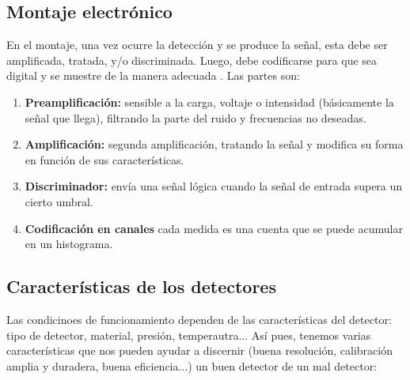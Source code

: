 \subsection{Montaje electrónico}

En el montaje, una vez ocurre la detección y se produce la señal, esta debe ser amplificada, tratada, y/o discriminada. Luego, debe codificarse para que sea digital y se muestre de la manera adecuada . Las partes son: 

\begin{enumerate}
    \item \textbf{Preamplificación:} sensible a la carga, voltaje o intensidad (básicamente la señal que llega), filtrando la parte del ruido y frecuencias no deseadas. 
    \item \textbf{Amplificación:} segunda amplificación, tratando la señal y modifica su forma en función de sus características.
    \item \textbf{Discriminador:} envía una señal lógica cuando la señal de entrada supera un cierto umbral.
    \item \textbf{Codificación en canales} cada medida es una cuenta que se puede acumular en un histograma. 
\end{enumerate}


\subsection{Características de los detectores}

Las condicinoes de funcionamiento dependen de las características del detector: tipo de detector, material, presión, temperautra... Así pues, tenemos varias características que nos pueden ayudar a discernir (buena resolución, calibración amplia y duradera, buena eficiencia...) un buen detector de un mal detector:


